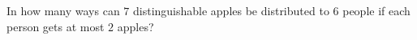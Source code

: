 In how many ways can $7$ distinguishable apples be distributed to $6$ people if each person gets at most $2$ apples?
